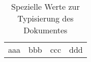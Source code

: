 \documentclass[english,ngerman,ToDo=no]{tudscrman}
\begin{document}
\Blindtext


\begin{table}
\caption{Spezielle Werte zur Typisierung des Dokumentes}
\label{tab:thesis}%
\centering%
\begin{tabular}{llll}
aaa&bbb&ccc&ddd
\end{tabular}
\end{table}

\Blindtext
\end{document}
